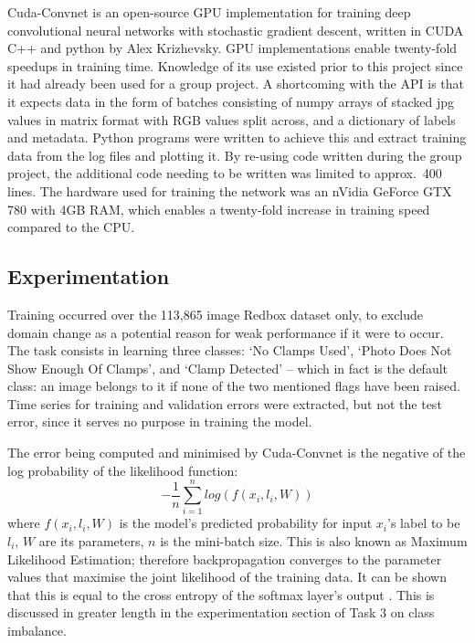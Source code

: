 \documentclass[a4paper,11pt]{article}
\begin{document}
Cuda-Convnet is an open-source GPU implementation for training deep convolutional neural networks with stochastic gradient descent, written in CUDA C++ and python by Alex Krizhevsky. GPU implementations enable twenty-fold speedups\cite{soumith-benchmark} in training time. Knowledge of its use existed prior to this project since it had already been used for a group project. A shortcoming with the API is that it expects data in the form of batches consisting of numpy arrays of stacked jpg values in matrix format with RGB values split across, and a dictionary of labels and metadata. Python programs were written to achieve this and extract training data from the log files and plotting it. By re-using code written during the group project, the additional code needing to be written was limited to approx.\ 400 lines. The hardware used for training the network was an nVidia GeForce GTX 780 with 4GB RAM, which enables a twenty-fold increase in training speed compared to the CPU. 

\subsection{Experimentation}

Training occurred over the 113,865 image Redbox dataset only, to exclude domain change as a potential reason for weak performance if it were to occur. The task consists in learning three classes: `No Clamps Used', `Photo Does Not Show Enough Of Clamps', and `Clamp Detected' -- which in fact is the default class: an image belongs to it if none of the two mentioned flags have been raised. Time series for training and validation errors were extracted, but not the test error, since it serves no purpose in training the model. 

The error being computed and minimised by Cuda-Convnet is the negative of the log probability of the likelihood function:
\begin{equation}
-\frac{1}{n}\sum\limits_{i=1}^{n} log(f(x_i,l_i,W))
\end{equation}
where $f(x_i,l_i,W)$ is the model's predicted probability for input $x_i$'s label to be $l_i$, $W$ are its parameters, $n$ is the mini-batch size. This is also known as Maximum Likelihood Estimation; therefore backpropagation converges to the parameter values that maximise the joint likelihood of the training data. It can be shown that this is equal to the cross entropy of the softmax layer's output \cite{DL-book}. This is discussed in greater length in the experimentation section of Task 3 on class imbalance. 
\end{document}
